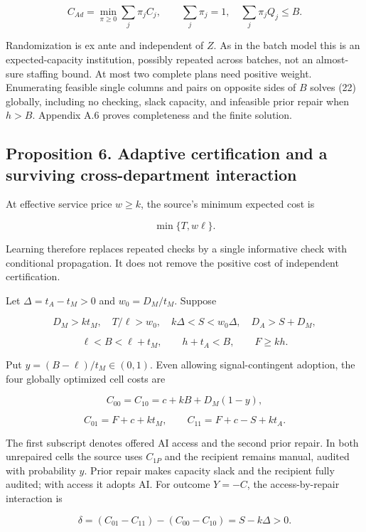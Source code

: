 \documentclass[
  11pt,
  a4paper,
]{article}
\begin{document}
\[C_{Ad}=\min_{\pi\geq0}\sum_j\pi_j C_j,\qquad
\sum_j\pi_j=1,\quad\sum_j\pi_jQ_j\leq B. \tag{22}\]

Randomization is ex ante and independent of \(Z\). As in the batch model
this is an expected-capacity institution, possibly repeated across
batches, not an almost-sure staffing bound. At most two complete plans
need positive weight. Enumerating feasible single columns and pairs on
opposite sides of \(B\) solves (22) globally, including no checking,
slack capacity, and infeasible prior repair when \(h>B\). Appendix A.6
proves completeness and the finite solution.

\hypertarget{proposition-6.-adaptive-certification-and-a-surviving-cross-department-interaction}{%
\subsection{Proposition 6. Adaptive certification and a surviving
cross-department
interaction}\label{proposition-6.-adaptive-certification-and-a-surviving-cross-department-interaction}}

At effective service price \(w\geq k\), the source's minimum expected
cost is

\[\min\{T,w\ell\}. \tag{23}\]

Learning therefore replaces repeated checks by a single informative
check with conditional propagation. It does not remove the positive cost
of independent certification.

Let \(\Delta=t_A-t_M>0\) and \(w_0=D_M/t_M\). Suppose

\[D_M>kt_M,\quad T/\ell>w_0,\quad
k\Delta<S<w_0\Delta,\quad D_A>S+D_M, \tag{24}\]

\[\ell<B<\ell+t_M,\qquad h+t_A<B,\qquad F\geq kh. \tag{25}\]

Put \(y=(B-\ell)/t_M\in(0,1)\). Even allowing signal-contingent
adoption, the four globally optimized cell costs are

\[C_{00}=C_{10}=c+kB+D_M(1-y), \tag{26}\]

\[C_{01}=F+c+kt_M,\qquad C_{11}=F+c-S+kt_A. \tag{27}\]

The first subscript denotes offered AI access and the second prior
repair. In both unrepaired cells the source uses \(C_{1P}\) and the
recipient remains manual, audited with probability \(y\). Prior repair
makes capacity slack and the recipient fully audited; with access it
adopts AI. For outcome \(Y=-C\), the access-by-repair interaction is

\[\delta=(C_{01}-C_{11})-(C_{00}-C_{10})=S-k\Delta>0. \tag{28}\]
\end{document}
